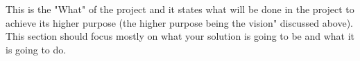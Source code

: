 This is the "What" of the project and it states what will be done in the project to achieve its higher purpose (the higher purpose being the vision" discussed above). This section should focus mostly on what your solution is going to be and what it is going to do.